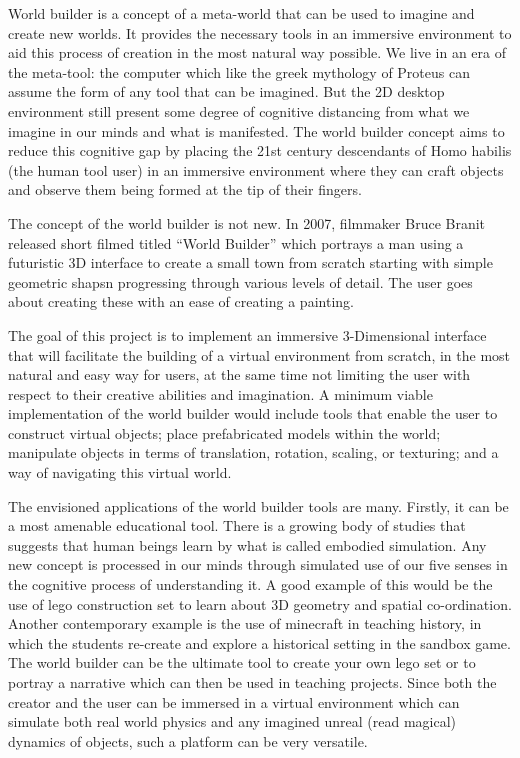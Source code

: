 World builder is a concept of a meta-world that can be used to imagine and create new worlds. It provides the necessary tools in an immersive
environment to aid this process of creation in the most natural way possible. We live in an era of the meta-tool: the computer which like the greek 
mythology of Proteus can assume the form of any tool that can be imagined. But the 2D desktop environment still present some degree of cognitive 
distancing from what we imagine in our minds and what is manifested. The world builder concept aims to reduce this cognitive gap by placing the 21st century descendants of Homo habilis (the human tool user) in an immersive environment where they can craft objects and observe them being formed
at the tip of their fingers.


The concept of the world builder is not new. In 2007, filmmaker Bruce Branit released short filmed titled ``World Builder'' \cite{video:WorldBuilder}
which portrays a man using a futuristic 3D interface to create a small town from scratch starting with simple geometric shapsn progressing through various levels of detail.  The user goes about creating these with an ease of creating a painting.


The goal of this project is to implement an immersive 3-Dimensional interface that will facilitate the building of a virtual environment from scratch, in
the most natural and easy way for users, at the same time not limiting the user with respect to their creative abilities and imagination. A 
minimum viable implementation of the world builder would include tools that enable the user to construct virtual objects; place prefabricated models 
within the world; manipulate objects in terms of translation, rotation, scaling, or texturing; and a way of navigating this virtual world.


The envisioned applications of the world builder tools are many. Firstly, it can be a most amenable educational tool. There is a growing body of studies 
that suggests that human beings learn by what is called embodied simulation. Any new concept is processed in our minds through simulated use of our five
senses in the cognitive process of understanding it. A good example of this would be the use of lego construction set to learn about 3D geometry and 
spatial co-ordination.  Another contemporary example is the use of minecraft in teaching history, in which the students re-create and explore a 
historical setting in the sandbox game. The world builder can be the ultimate tool to create your own lego set or to portray a narrative which can then
be used in teaching projects. Since both the creator and the user can be immersed in a virtual environment which can simulate both real world physics 
and any imagined unreal (read magical) dynamics of objects, such a platform can be very versatile. 


